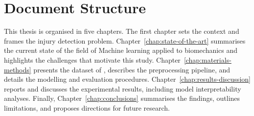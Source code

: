 \section{Document Structure}\label{sec:intro-structure}
This thesis is organised in five chapters. The first chapter sets the context and frames the injury detection problem. Chapter~\ref{chap:state-of-the-art} summarises the current state of the field of Machine learning applied to biomechanics and highlights the challenges that motivate this study. Chapter~\ref{chap:materials-methods} presents the dataset of \citet{Ferber2024}, describes the preprocessing pipeline, and details the modelling and evaluation procedures. Chapter~\ref{chap:results-discussion} reports and discusses the experimental results, including model interpretability analyses. Finally, Chapter~\ref{chap:conclusions} summarises the findings, outlines limitations, and proposes directions for future research.
